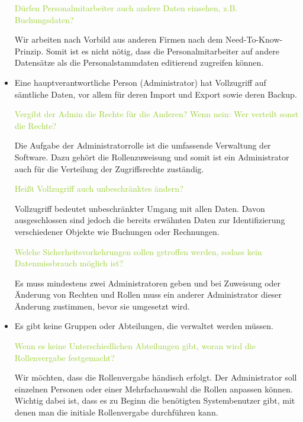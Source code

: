 \begin{itemize}
    \textcolor{YellowGreen}{Dürfen Personalmitarbeiter auch andere Daten einsehen, z.B. Buchungsdaten?}

    \textcolor{NavyBlue}{Wir arbeiten nach Vorbild aus anderen Firmen nach dem \grqq{}Need-To-Know\grqq{}-Prinzip. Somit ist es nicht nötig, dass die Personalmitarbeiter auf andere Datensätze als die Personalstammdaten editierend zugreifen können.}

    \item Eine hauptverantwortliche Person (Administrator) hat Vollzugriff auf sämtliche Daten, vor allem für deren Import und Export sowie deren Backup. 
    
    \textcolor{YellowGreen}{Vergibt der Admin die Rechte für die Anderen? Wenn nein: Wer verteilt sonst die Rechte?}

    \textcolor{NavyBlue}{Die Aufgabe der Administratorrolle ist die umfassende Verwaltung der Software. Dazu gehört die Rollenzuweisung und somit ist ein Administrator auch für die Verteilung der Zugriffsrechte zuständig.}

    \textcolor{YellowGreen}{Heißt Vollzugriff auch unbeschränktes ändern?}

    \textcolor{NavyBlue}{Vollzugriff bedeutet unbeschränkter Umgang mit allen Daten. Davon ausgeschlossen sind jedoch die bereits erwähnten Daten zur Identifizierung verschiedener Objekte wie Buchungen oder Rechnungen.}

    \textcolor{YellowGreen}{Welche Sicherheitsvorkehrungen sollen getroffen werden, sodass kein Datenmissbrauch möglich ist?}

    \textcolor{NavyBlue}{Es muss mindestens zwei Administratoren geben und bei Zuweisung oder Änderung von Rechten und Rollen muss ein anderer Administrator dieser Änderung zustimmen, bevor sie umgesetzt wird.}

    \item Es gibt keine Gruppen oder Abteilungen, die verwaltet werden müssen.
    
    \textcolor{YellowGreen}{Wenn es keine Unterschiedlichen Abteilungen gibt, woran wird die Rollenvergabe festgemacht?}

    \textcolor{NavyBlue}{Wir möchten, dass die Rollenvergabe händisch erfolgt. Der Administrator soll einzelnen Personen oder einer Mehrfachauswahl die Rollen anpassen können. Wichtig dabei ist, dass es zu Beginn die benötigten Systembenutzer gibt, mit denen man die initiale Rollenvergabe durchführen kann.}

\end{itemize}


